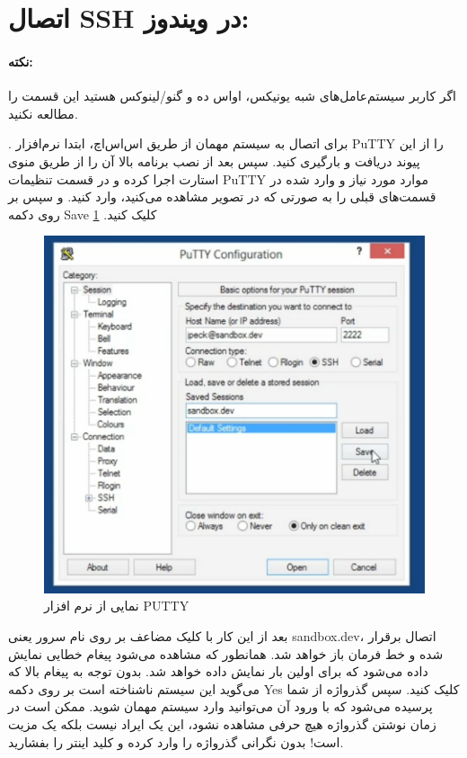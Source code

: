\begin{latin}
    
\end{latin}
\section{ اتصال SSH در ویندوز:}
\paragraph*{    نکته: }
    اگر کاربر سیستم‌عامل‌های شبه یونیکس، او‌اس ده و گنو/لینوکس هستید این قسمت را مطالعه نکنید.
    
    . برای اتصال به سیستم مهمان از طریق اس‌اس‌اچ، ابتدا نرم‌افزار PuTTY را از  این پیوند دریافت و بارگیری کنید. سپس بعد از نصب برنامه بالا آن را از طریق منوی استارت اجرا کرده و در قسمت تنظیمات PuTTY موارد مورد نیاز و وارد شده در قسمت‌های قبلی را به صورتی که در تصویر  مشاهده می‌کنید، وارد کنید. و سپس بر روی دکمه Save کلیک کنید. \ref{PUTTY1}
\begin{figure}
    \includegraphics[width=.89\textwidth ,height=.85\textwidth]{Pic/PUTTY1}
    \caption{ نمایی از نرم افزار PUTTY}
    \label{PUTTY1}
\end{figure}

بعد از این کار با کلیک مضاعف بر روی نام سرور یعنی sandbox.dev، اتصال برقرار شده و خط فرمان باز خواهد شد. همانطور که مشاهده می‌شود پیغام خطایی نمایش داده می‌شود که برای اولین بار نمایش داده خواهد شد. بدون توجه به پیغام بالا که می‌گوید این سیستم ناشناخته است بر روی دکمه Yes کلیک کنید.  سپس گذرواژه از شما پرسیده می‌شود که با ورود آن می‌توانید وارد سیستم مهمان شوید. ممکن است در زمان نوشتن گذرواژه هیچ حرفی مشاهده نشود، این یک ایراد نیست بلکه یک مزیت است! بدون نگرانی گذرواژه را وارد کرده و کلید اینتر را بفشارید.

